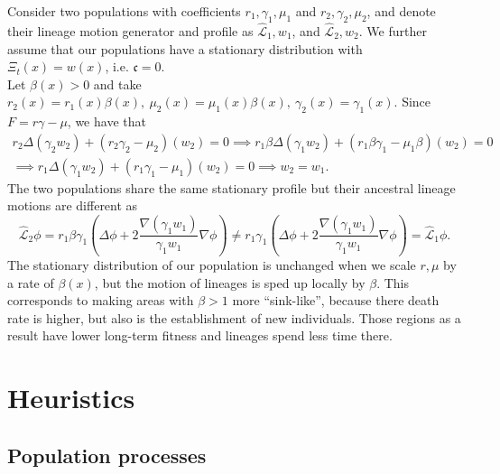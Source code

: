 \documentclass[12pt]{article}
\def \hat{\widehat}
\begin{document}
Consider two populations with coefficients $r_1, \gamma_1, \mu_1$ and  $r_2, \gamma_2, \mu_2$, and denote their lineage motion generator and profile as $\hat{\mathcal{L}}_1,w_1$, and $\hat{\mathcal{L}}_2,w_2$. We further assume that our populations have a stationary distribution with $\Xi_t(x)=w(x)$, i.e. $\mathfrak{c}=0$.\\
Let $\beta(x)>0$ and take $r_2(x)=r_1(x)\beta(x),~ \mu_2(x)=\mu_1(x)\beta(x),~ \gamma_2(x)=\gamma_1(x)$. Since $F=r\gamma-\mu$, we have that 
\begin{multline}
\label{eq: same profile scaled}
r_2\Delta(\gamma_2 w_2)+(r_2\gamma_2-\mu_2)(w_2)=0\implies r_1\beta \Delta(\gamma_1 w_2)+(r_1\beta \gamma_1-\mu_1 \beta)(w_2)=0\\
\implies r_1 \Delta(\gamma_1 w_2)+(r_1 \gamma_1-\mu_1)(w_2)=0 \implies w_2=w_1.
\end{multline}
The two populations share the same stationary profile but their ancestral lineage motions are different as 
\begin{equation}
\label{eq: different generator scaled}
\hat{\mathcal{L}}_2 \phi = r_1 \beta \gamma_1\left(\Delta\phi+2\frac{\nabla(\gamma_1 w_1)}{\gamma_1 w_1}\nabla\phi\right)\neq r_1 \gamma_1\left(\Delta\phi+2\frac{\nabla(\gamma_1 w_1)}{\gamma_1 w_1}\nabla\phi\right) = \hat{\mathcal{L}}_1 \phi.
\end{equation}
The stationary distribution of our population is unchanged when we scale $r,\mu$ by a rate of $\beta(x)$,
but the motion of lineages is sped up locally by $\beta$.
This corresponds to making areas with $\beta > 1$ more ``sink-like'',
because there death rate is higher, but also is the establishment of new individuals. Those regions as a result have lower long-term fitness and lineages spend less time there.


\section{Heuristics}

\subsection{Population processes}
\end{document}
